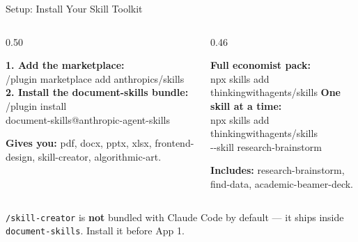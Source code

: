 \documentclass[aspectratio=169, 10pt]{beamer}
\begin{document}
\begin{frame}[fragile]{Setup: Install Your Skill Toolkit}
\begin{columns}[T]
\begin{column}{0.50\textwidth}
\begin{tcolorbox}[keybox, title={\faDownload\quad Anthropic skills (one-time)}]
\scriptsize
\textbf{1. Add the marketplace:}\\
{\tiny\ttfamily /plugin marketplace add anthropics/skills}
\vskip3pt
\textbf{2. Install the document-skills bundle:}\\
{\tiny\ttfamily /plugin install \\\hspace*{1em}document-skills@anthropic-agent-skills}
\vskip3pt
{\raggedright\textbf{Gives you:} {\fontsize{6.5}{8}\selectfont\ttfamily pdf, docx, pptx, xlsx, frontend-design, skill-creator, algorithmic-art.}\par}
\end{tcolorbox}
\end{column}
\begin{column}{0.46\textwidth}
\begin{tcolorbox}[keybox, title={\faBoxes\quad Third-party skills via \texttt{npx}}]
\scriptsize
\textbf{Full economist pack:}\\
{\tiny\ttfamily npx skills add thinkingwithagents/skills}
\vskip3pt
\textbf{One skill at a time:}\\
{\tiny\ttfamily npx skills add thinkingwithagents/skills \\\hspace*{1em}-{}-skill research-brainstorm}
\vskip3pt
{\raggedright\textbf{Includes:} {\fontsize{6.5}{8}\selectfont\ttfamily research-brainstorm, find-data, academic-beamer-deck.}\par}
\end{tcolorbox}
\end{column}
\end{columns}
\vskip4pt
\pause
\begin{tcolorbox}[colback=SoftCoral!8, colframe=SoftCoral, boxrule=0.5pt, left=5pt, right=5pt, top=2pt, bottom=2pt, halign=center]
\scriptsize \faExclamationCircle\; \texttt{/skill-creator} is \textbf{not} bundled with Claude Code by default --- it ships inside \texttt{document-skills}. Install it before App 1.
\end{tcolorbox}
\end{frame}
\end{document}
